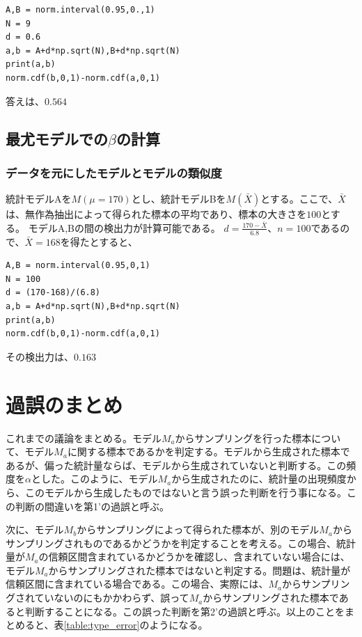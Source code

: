 \begin{lstlisting}
A,B = norm.interval(0.95,0.,1)
N = 9
d = 0.6
a,b = A+d*np.sqrt(N),B+d*np.sqrt(N)
print(a,b)
norm.cdf(b,0,1)-norm.cdf(a,0,1)
\end{lstlisting}

答えは、$0.564$

\subsection{最尤モデルでの$\beta$の計算}
\subsubsection{データを元にしたモデルとモデルの類似度}
統計モデルAを$M(\mu=170)$とし、統計モデルBを$M(\bar{X})$とする。ここで、$\bar{X}$は、無作為抽出によって得られた標本の平均であり、標本の大きさを$100$とする。
モデルA,Bの間の検出力が計算可能である。
$d=\frac{170-\bar{X}}{6.8}$、$n=100$であるので、$\bar{X}=168$を得たとすると、
\begin{lstlisting}
A,B = norm.interval(0.95,0,1)
N = 100
d = (170-168)/(6.8)
a,b = A+d*np.sqrt(N),B+d*np.sqrt(N)
print(a,b)
norm.cdf(b,0,1)-norm.cdf(a,0,1)
\end{lstlisting}
その検出力は、$0.163$


\section{過誤のまとめ}
これまでの議論をまとめる。モデル$M_a$からサンプリングを行った標本について、モデル$M_a$に関する標本であるかを判定する。モデルから生成された標本であるが、偏った統計量ならば、モデルから生成されていないと判断する。この頻度を$\alpha$とした。このように、モデル$M_a$から生成されたのに、統計量の出現頻度から、このモデルから生成したものではないと言う誤った判断を行う事になる。この判断の間違いを第1'の過誤と呼ぶ。

次に、モデル$M_b$からサンプリングによって得られた標本が、別のモデル$M_a$からサンプリングされものであるかどうかを判定することを考える。この場合、統計量が$M_a$の信頼区間含まれているかどうかを確認し、含まれていない場合には、モデル$M_a$からサンプリングされた標本ではないと判定する。問題は、統計量が信頼区間に含まれている場合である。この場合、実際には、$M_a$からサンプリングされていないのにもかかわらず、誤って$M_a$からサンプリングされた標本であると判断することになる。この誤った判断を第2'の過誤と呼ぶ。以上のことをまとめると、表\ref{table:type_error}のようになる。

